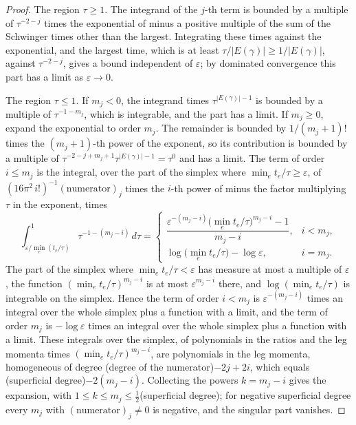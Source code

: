 \begin{proof}
The region $\tau\ge1$. The integrand of the $j$-th term is bounded by a multiple of $\tau^{-2-j}$ times the exponential of minus a positive multiple of the sum of the Schwinger times other than the largest. Integrating these times against the exponential, and the largest time, which is at least $\tau/|E(\gamma)|\ge1/|E(\gamma)|$, against $\tau^{-2-j}$, gives a bound independent of $\varepsilon$; by dominated convergence this part has a limit as $\varepsilon\to0$.

The region $\tau\le1$. If $m_j<0$, the integrand times $\tau^{|E(\gamma)|-1}$ is bounded by a multiple of $\tau^{-1-m_j}$, which is integrable, and the part has a limit. If $m_j\ge0$, expand the exponential to order $m_j$. The remainder is bounded by $1/(m_j+1)!$ times the $(m_j+1)$-th power of the exponent, so its contribution is bounded by a multiple of $\tau^{-2-j+m_j+1}\tau^{|E(\gamma)|-1}=\tau^0$ and has a limit. The term of order $i\le m_j$ is the integral, over the part of the simplex where $\min_et_e/\tau\ge\varepsilon$, of $(16\pi^2\,i!)^{-1}(\text{numerator})_j$ times the $i$-th power of minus the factor multiplying $\tau$ in the exponent, times
\[
\int_{\varepsilon/\min_e(t_e/\tau)}^{1}\tau^{-1-(m_j-i)}\,d\tau=\begin{cases}\dfrac{\varepsilon^{-(m_j-i)}\big(\min_et_e/\tau\big)^{m_j-i}-1}{m_j-i}, & i<m_j,\\[2mm] \log\big(\min_et_e/\tau\big)-\log\varepsilon, & i=m_j.\end{cases}
\]
The part of the simplex where $\min_et_e/\tau<\varepsilon$ has measure at most a multiple of $\varepsilon$, the function $(\min_et_e/\tau)^{m_j-i}$ is at most $\varepsilon^{m_j-i}$ there, and $\log(\min_et_e/\tau)$ is integrable on the simplex. Hence the term of order $i<m_j$ is $\varepsilon^{-(m_j-i)}$ times an integral over the whole simplex plus a function with a limit, and the term of order $m_j$ is $-\log\varepsilon$ times an integral over the whole simplex plus a function with a limit. These integrals over the simplex, of polynomials in the ratios and the leg momenta times $(\min_et_e/\tau)^{m_j-i}$, are polynomials in the leg momenta, homogeneous of degree (degree of the numerator)$-2j+2i$, which equals (superficial degree)$-2(m_j-i)$. Collecting the powers $k=m_j-i$ gives the expansion, with $1\le k\le m_j\le\frac12$(superficial degree); for negative superficial degree every $m_j$ with $(\text{numerator})_j\neq0$ is negative, and the singular part vanishes.


\end{proof}

